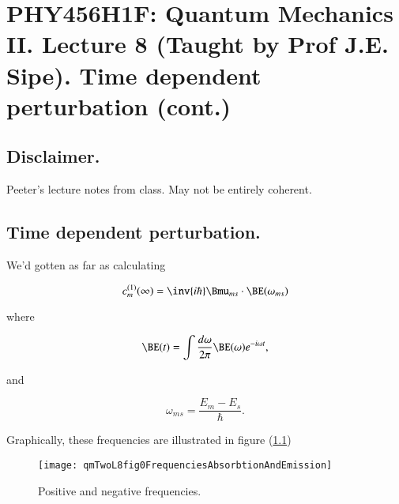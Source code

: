 %
%

%
%

\chapter{PHY456H1F: Quantum Mechanics II.  Lecture 8 (Taught by Prof J.E. Sipe).  Time dependent perturbation (cont.)}
\label{chap:qmTwoL8}
{}
\date{Oct 3, 2011}

\beginArtWithToc

\section{Disclaimer.}

Peeter's lecture notes from class.  May not be entirely coherent.

\section{Time dependent perturbation.}

We'd gotten as far as calculating

\begin{equation}\label{eqn:qmTwoL8:10}
c_m^{(1)}(\infty) = \inv{i \hbar} \Bmu_{ms} \cdot \BE(\omega_{ms})
\end{equation}

where

\begin{equation}\label{eqn:qmTwoL8:30}
\BE(t) = \int \frac{d\omega}{2 \pi} \BE(\omega) e^{-i \omega t},
\end{equation}

and

\begin{equation}\label{eqn:qmTwoL8:50}
\omega_{ms} = \frac{E_m - E_s}{\hbar}.
\end{equation}

Graphically, these frequencies are illustrated in figure (\ref{fig:qmTwoL8fig0FrequenciesAbsorbtionAndEmission})
%
\begin{figure}[htp]
\centering
\texttt{[image: qmTwoL8fig0FrequenciesAbsorbtionAndEmission]}
\caption{Positive and negative frequencies.}\label{fig:qmTwoL8fig0FrequenciesAbsorbtionAndEmission}
\end{figure}

